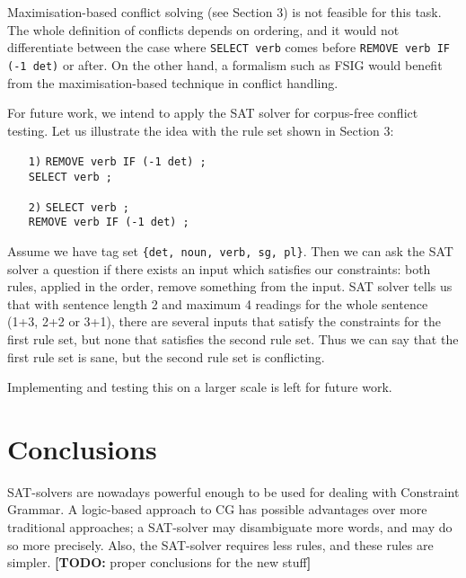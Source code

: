 \documentclass[11pt]{article}
\newcommand{\todo}[1]{{\color{cyan}\textbf{[TODO: }#1\textbf{]}}}
\begin{document}
Maximisation-based conflict solving (see Section 3) is not feasible for this task. 
The whole definition of conflicts depends on ordering, and it would
not differentiate between the case where \texttt{SELECT verb} comes
before \texttt{REMOVE verb IF (-1 det)} or after.
On the other hand, a formalism such as FSIG would benefit from the
maximisation-based technique in conflict handling.

For future work, we intend to apply the SAT solver for corpus-free
conflict testing. Let us illustrate the idea with the rule
set shown in Section 3:


\begin{itemize}
\item [\texttt{1)}] \texttt{REMOVE verb IF (-1 det) ;} \\
         \texttt{SELECT verb ;}

\item [\texttt{2)}] \texttt{SELECT verb ;} \\
         \texttt{REMOVE verb IF (-1 det) ;} 
\end{itemize}

Assume we have tag set \texttt{\{det, noun, verb, sg, pl\}}. Then we
can ask the SAT solver a question if there exists an input which
satisfies our constraints: both rules, applied in the order, remove
something from the input.
SAT solver tells us that with sentence length 2 and maximum 4 readings
for the whole sentence (1+3, 2+2 or 3+1), there are several inputs that
satisfy the constraints for the first rule set, but none that
satisfies the second rule set. Thus we can say that the first rule set
is sane, but the second rule set is conflicting.

Implementing and testing this on a larger scale is left for future work.



\section{Conclusions}

SAT-solvers are nowadays powerful enough to be used for dealing with
Constraint Grammar. A logic-based approach to CG has possible
advantages over more traditional approaches; a SAT-solver may
disambiguate more words, and may do so more precisely. Also, the
SAT-solver requires less rules, and these rules are simpler. 
\todo{proper conclusions for the new stuff}
\end{document}
